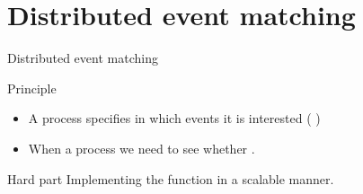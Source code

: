 \section{Distributed event matching}
\begin{frame}{Distributed event matching}
  \begin{centerfig}
  \end{centerfig}
  \begin{block}{Principle}
    \begin{itemize}%
      \item A process specifies in which events it is interested ( )
      \item When a process   we need to see whether  
            .
    \end{itemize}
  \end{block}

  \begin{alertblock}{Hard part}
    Implementing the  function in a scalable manner.
  \end{alertblock}
\end{frame}
